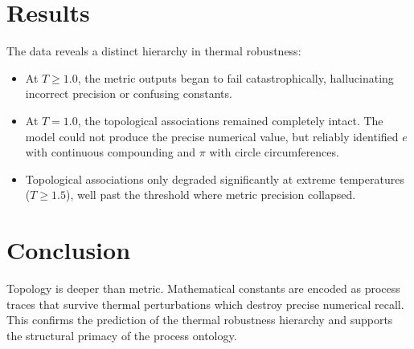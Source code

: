 \documentclass[12pt,a4paper]{article}
\begin{document}
\section{Results}

The data reveals a distinct hierarchy in thermal robustness:
\begin{itemize}
    \item At $T \ge 1.0$, the metric outputs began to fail catastrophically, hallucinating incorrect precision or confusing constants.
    \item At $T = 1.0$, the topological associations remained completely intact. The model could not produce the precise numerical value, but reliably identified $e$ with continuous compounding and $\pi$ with circle circumferences.
    \item Topological associations only degraded significantly at extreme temperatures ($T \ge 1.5$), well past the threshold where metric precision collapsed.
\end{itemize}

\section{Conclusion}

Topology is deeper than metric. Mathematical constants are encoded as process traces that survive thermal perturbations which destroy precise numerical recall. This confirms the prediction of the thermal robustness hierarchy and supports the structural primacy of the process ontology.
\end{document}
